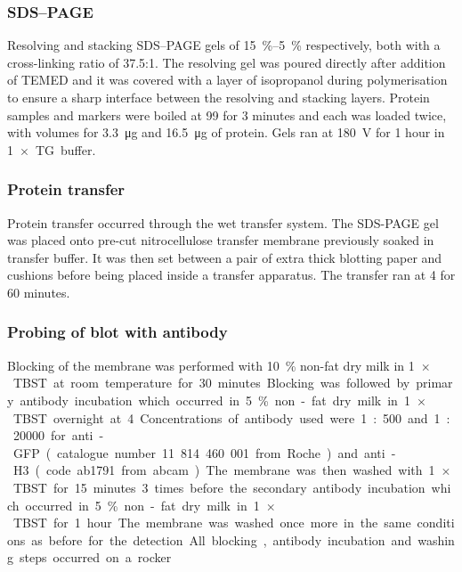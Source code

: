     \subsubsection{SDS--PAGE}
      Resolving and stacking SDS--PAGE gels of \SIrange{15}{5}{\percent} respectively, both with a
      cross-linking ratio of \num{37.5}:1. The resolving gel was poured directly after addition
      of TEMED and it was covered with a layer of isopropanol during polymerisation
      to ensure a sharp interface between the resolving and stacking layers.
      Protein samples and markers were boiled at \SI{99}{\dc} for 3 minutes and each
      was loaded twice, with volumes for \SI{3.3}{\ug} and \SI{16.5}{\ug} of protein. Gels ran at
      \SI{180}{\volt} for 1 hour in \SI{1}{$\times$} TG buffer.
    
    \subsubsection{Protein transfer}
      Protein transfer occurred through the wet transfer system. The SDS-PAGE gel
      was placed onto pre-cut nitrocellulose transfer membrane previously soaked in
      transfer buffer. It was then set between a pair of extra thick blotting paper and
      cushions before being placed inside a transfer apparatus. The transfer ran at
      \SI{4}{\dc} for 60 minutes.
    
    \subsubsection{Probing of blot with antibody}
      Blocking of the membrane was performed with \SI{10}{\percent} non-fat dry milk in \SI{1}{$\times$} TBST
      at room temperature for 30 minutes. Blocking was followed by primary antibody
      incubation which occurred in \SI{5}{\percent} non-fat dry milk in \SI{1}{$\times$} TBST overnight at
      \SI{4}{\dc}. Concentrations of antibody used were 1:500 and 1:20000 for anti-GFP
      (catalogue number 11 814 460 001 from Roche) and anti-H3 (code ab1791 from
      abcam). The membrane was then washed with \SI{1}{$\times$} TBST for 15 minutes 3 times
      before the secondary antibody incubation which occurred in \SI{5}{\percent} non-fat dry
      milk in \SI{1}{$\times$} TBST for 1 hour. The membrane was washed once more in the same
      conditions as before for the detection. All blocking, antibody incubation and
      washing steps occurred on a rocker.
      
